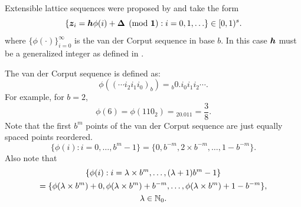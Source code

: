 \documentclass[authoryear]{elsarticle}
\newcommand{\appxintn}{\appxint_n}
\DeclareMathOperator{\appxint}{\hat{I}}
\begin{document}









Extensible lattice sequences were proposed by \cite{HicEtal00,Mai81a} and take the form
\begin{equation} \label{eq:extlat}
    \{\boldsymbol{z}_i = \boldsymbol{h}\phi(i)+ \boldsymbol{\Delta} \pmod{\boldsymbol{1}} : i=0,1, \ldots \} \in [0,1)^s.
\end{equation}
where $\{\phi(\cdot)\}_{i=0}^\infty$ is the van der Corput sequence in base $b$.  In this case $\boldsymbol{h}$ must be a generalized integer as defined in \cite[Section 2]{HicNie03a}.

The van der Corput sequence is defined as: 
\[
\phi((\cdots i_2 i_1 i_0)_b) = {}_b0.i_0 i_1 i_2 \cdots.
\]
For example, for $b=2$,
\[
\phi(6) = \phi(110_2) = {}_20.011 = \frac 38.
\]
Note that the first ${b^m}$ points of the van der Corput sequence are just equally spaced points reordered. 
\begin{equation} \label{eq:phipropone}
\{ \phi(i) : i = 0, \ldots, b^m-1 \} = \{0, b^{-m}, 2\times b^{-m}, \ldots, 1 - b^{-m} \}.
\end{equation}
Also note that
\begin{multline} \label{eq:phiproptwo}
\{ \phi(i) : i = \lambda \times b^m , \ldots, (\lambda+1)b^m-1 \} \\
= \{\phi(\lambda \times b^m) + 0, \phi(\lambda \times b^m) + b^{-m}, \ldots, \phi(\lambda \times b^m) + 1 - b^{-m} \} , \\
\lambda \in \mathbb{N}_{0}.
\end{multline}





 
\end{document}
